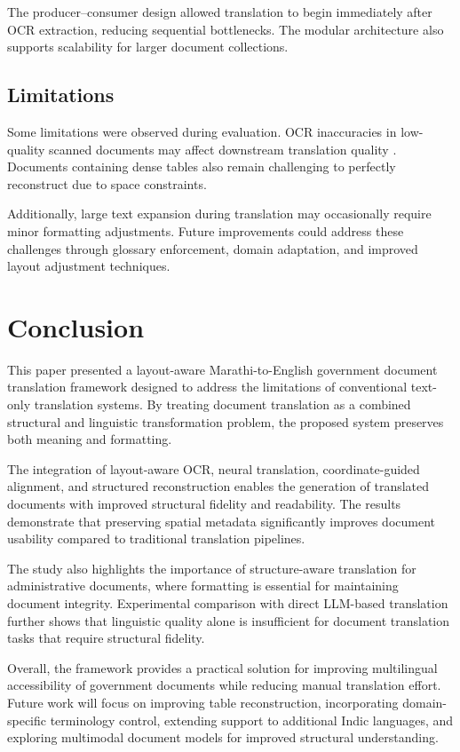\documentclass[11pt]{article}
\begin{document}
The producer–consumer design allowed translation to begin immediately after OCR extraction, reducing sequential bottlenecks. The modular architecture also supports scalability for larger document collections.

\subsection{Limitations}

Some limitations were observed during evaluation. OCR inaccuracies in low-quality scanned documents may affect downstream translation quality \cite{smith2007tesseract,baek_what_2019}. Documents containing dense tables also remain challenging to perfectly reconstruct due to space constraints.

Additionally, large text expansion during translation may occasionally require minor formatting adjustments. Future improvements could address these challenges through glossary enforcement, domain adaptation, and improved layout adjustment techniques.

\section{Conclusion}

This paper presented a layout-aware Marathi-to-English government document translation framework designed to address the limitations of conventional text-only translation systems. By treating document translation as a combined structural and linguistic transformation problem, the proposed system preserves both meaning and formatting.

The integration of layout-aware OCR, neural translation, coordinate-guided alignment, and structured reconstruction enables the generation of translated documents with improved structural fidelity and readability. The results demonstrate that preserving spatial metadata significantly improves document usability compared to traditional translation pipelines.

The study also highlights the importance of structure-aware translation for administrative documents, where formatting is essential for maintaining document integrity. Experimental comparison with direct LLM-based translation further shows that linguistic quality alone is insufficient for document translation tasks that require structural fidelity.

Overall, the framework provides a practical solution for improving multilingual accessibility of government documents while reducing manual translation effort. Future work will focus on improving table reconstruction, incorporating domain-specific terminology control, extending support to additional Indic languages, and exploring multimodal document models for improved structural understanding.
\end{document}
